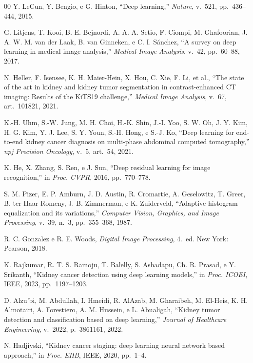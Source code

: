 \documentclass[conference]{IEEEtran}
\begin{document}
\begin{thebibliography}{00}
Y. LeCun, Y. Bengio, e G. Hinton,
``Deep learning,''
\textit{Nature}, v.~521, pp.~436--444, 2015.

G. Litjens, T. Kooi, B. E. Bejnordi, A. A. A. Setio, F. Ciompi,
M. Ghafoorian, J. A. W. M. van der Laak, B. van Ginneken, e C. I. Sánchez,
``A survey on deep learning in medical image analysis,''
\textit{Medical Image Analysis}, v.~42, pp.~60--88, 2017.

N. Heller, F. Isensee, K. H. Maier-Hein, X. Hou, C. Xie, F. Li, et al.,
``The state of the art in kidney and kidney tumor segmentation in
contrast-enhanced CT imaging: Results of the KiTS19 challenge,''
\textit{Medical Image Analysis}, v.~67, art.~101821, 2021.

K.-H. Uhm, S.-W. Jung, M. H. Choi, H.-K. Shin, J.-I. Yoo, S. W. Oh,
J. Y. Kim, H. G. Kim, Y. J. Lee, S. Y. Youn, S.-H. Hong, e S.-J. Ko,
``Deep learning for end-to-end kidney cancer diagnosis on multi-phase
abdominal computed tomography,''
\textit{npj Precision Oncology}, v.~5, art.~54, 2021.

K. He, X. Zhang, S. Ren, e J. Sun,
``Deep residual learning for image recognition,''
in \textit{Proc. CVPR}, 2016, pp.~770--778.

S. M. Pizer, E. P. Amburn, J. D. Austin, R. Cromartie, A. Geselowitz,
T. Greer, B. ter Haar Romeny, J. B. Zimmerman, e K. Zuiderveld,
``Adaptive histogram equalization and its variations,''
\textit{Computer Vision, Graphics, and Image Processing},
v.~39, n.~3, pp.~355--368, 1987.

R. C. Gonzalez e R. E. Woods,
\textit{Digital Image Processing}, 4.~ed. New York: Pearson, 2018.

K. Rajkumar, R. T. S. Ramoju, T. Balelly, S. Ashadapu, Ch. R. Prasad, e Y. Srikanth,
``Kidney cancer detection using deep learning models,''
in \textit{Proc. ICOEI}, IEEE, 2023, pp.~1197--1203.

D. Alzu'bi, M. Abdullah, I. Hmeidi, R. AlAzab, M. Gharaibeh, M. El-Heis,
K. H. Almotairi, A. Forestiero, A. M. Hussein, e L. Abualigah,
``Kidney tumor detection and classification based on deep learning,''
\textit{Journal of Healthcare Engineering}, v.~2022, p.~3861161, 2022.

N. Hadjiyski,
``Kidney cancer staging: deep learning neural network based approach,''
in \textit{Proc. EHB}, IEEE, 2020, pp.~1--4.


\end{thebibliography}
\end{document}

